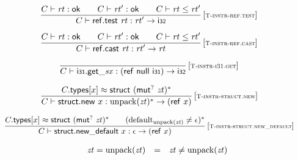$$
\begin{array}{@{}c@{}}\displaystyle
\frac{
C \vdash {\mathit{rt}} : \mathsf{ok}
 \qquad
C \vdash {\mathit{rt}'} : \mathsf{ok}
 \qquad
C \vdash {\mathit{rt}} \leq {\mathit{rt}'}
}{
C \vdash \mathsf{ref{.}test}~{\mathit{rt}} : {\mathit{rt}'} \rightarrow \mathsf{i{\scriptstyle 32}}
} \, {[\textsc{\scriptsize T{-}instr{-}ref.test}]}
\qquad
\end{array}
$$

$$
\begin{array}{@{}c@{}}\displaystyle
\frac{
C \vdash {\mathit{rt}} : \mathsf{ok}
 \qquad
C \vdash {\mathit{rt}'} : \mathsf{ok}
 \qquad
C \vdash {\mathit{rt}} \leq {\mathit{rt}'}
}{
C \vdash \mathsf{ref{.}cast}~{\mathit{rt}} : {\mathit{rt}'} \rightarrow {\mathit{rt}}
} \, {[\textsc{\scriptsize T{-}instr{-}ref.cast}]}
\qquad
\end{array}
$$

\vspace{1ex}

$$
\begin{array}{@{}c@{}}\displaystyle
\frac{
}{
C \vdash {\mathsf{i{\scriptstyle 31}{.}get}}{\mathsf{\_}}{{\mathit{sx}}} : (\mathsf{ref}~\mathsf{null}~\mathsf{i{\scriptstyle 31}}) \rightarrow \mathsf{i{\scriptstyle 32}}
} \, {[\textsc{\scriptsize T{-}instr{-}i31.get}]}
\qquad
\end{array}
$$

\vspace{1ex}

$$
\begin{array}{@{}c@{}}\displaystyle
\frac{
C{.}\mathsf{types}{}[x] \approx \mathsf{struct}~{({\mathsf{mut}^?}~{\mathit{zt}})^\ast}
}{
C \vdash \mathsf{struct{.}new}~x : {{\mathrm{unpack}}({\mathit{zt}})^\ast} \rightarrow (\mathsf{ref}~x)
} \, {[\textsc{\scriptsize T{-}instr{-}struct.new}]}
\qquad
\end{array}
$$

$$
\begin{array}{@{}c@{}}\displaystyle
\frac{
C{.}\mathsf{types}{}[x] \approx \mathsf{struct}~{({\mathsf{mut}^?}~{\mathit{zt}})^\ast}
 \qquad
({{\mathrm{default}}}_{{\mathrm{unpack}}({\mathit{zt}})} \neq \epsilon)^\ast
}{
C \vdash \mathsf{struct{.}new\_default}~x : \epsilon \rightarrow (\mathsf{ref}~x)
} \, {[\textsc{\scriptsize T{-}instr{-}struct.new\_default}]}
\qquad
\end{array}
$$

$$
\begin{array}[t]{@{}lcl@{}l@{}}
{\mathit{zt}} = {\mathrm{unpack}}({\mathit{zt}}) & = & {\mathit{zt}} \neq {\mathrm{unpack}}({\mathit{zt}}) \\
\end{array}
$$

